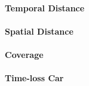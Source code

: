 \paragraph{Temporal Distance}

\paragraph{Spatial Distance}

\paragraph{Coverage}

\paragraph{Time-loss Car}